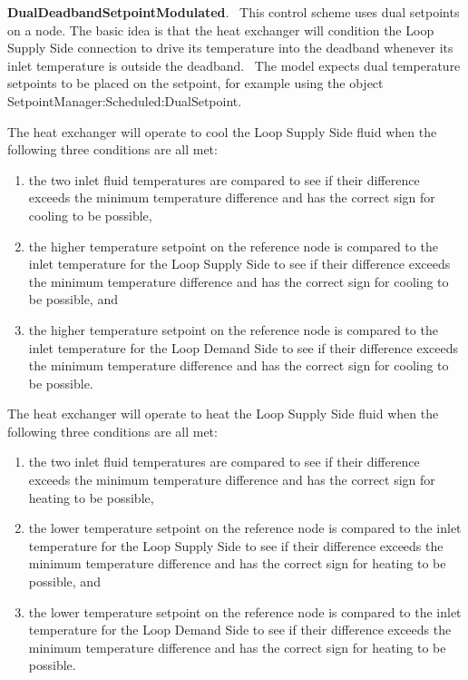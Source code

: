\textbf{DualDeadbandSetpointModulated}.~ This control scheme uses dual setpoints on a node. The basic idea is that the heat exchanger will condition the Loop Supply Side connection to drive its temperature into the deadband whenever its inlet temperature is outside the deadband.~ The model expects dual temperature setpoints to be placed on the setpoint, for example using the object SetpointManager:Scheduled:DualSetpoint.

The heat exchanger will operate to cool the Loop Supply Side fluid when the following three conditions are all met:

\begin{enumerate}
\def\labelenumi{\arabic{enumi})}
\tightlist
\item the two inlet fluid temperatures are compared to see if their difference exceeds the minimum temperature difference and has the correct sign for cooling to be possible,
\item the higher temperature setpoint on the reference node is compared to the inlet temperature for the Loop Supply Side to see if their difference exceeds the minimum temperature difference and has the correct sign for cooling to be possible, and
\item the higher temperature setpoint on the reference node is compared to the inlet temperature for the Loop Demand Side to see if their difference exceeds the minimum temperature difference and has the correct sign for cooling to be possible.
\end{enumerate}

The heat exchanger will operate to heat the Loop Supply Side fluid when the following three conditions are all met:

\begin{enumerate}
\def\labelenumi{\arabic{enumi})}
\tightlist
\item the two inlet fluid temperatures are compared to see if their difference exceeds the minimum temperature difference and has the correct sign for heating to be possible,
\item the lower temperature setpoint on the reference node is compared to the inlet temperature for the Loop Supply Side to see if their difference exceeds the minimum temperature difference and has the correct sign for heating to be possible, and
\item the lower temperature setpoint on the reference node is compared to the inlet temperature for the Loop Demand Side to see if their difference exceeds the minimum temperature difference and has the correct sign for heating to be possible.
\end{enumerate}

